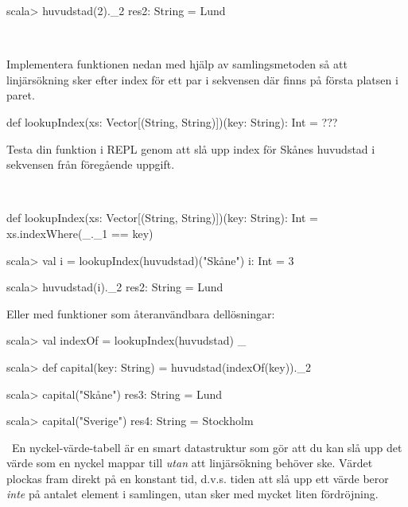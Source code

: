 \SubtaskSolved
\begin{REPL}
scala> huvudstad(2)._2
res2: String = Lund
\end{REPL}

\QUESTEND




\QUESTBEGIN

\Task \what~

\Subtask Implementera funktionen  nedan med hjälp av samlingsmetoden  så att linjärsökning sker efter index för ett par i sekvensen där  finns på första platsen i paret.

\begin{Code}
def lookupIndex(xs: Vector[(String, String)])(key: String): Int = ???
\end{Code}

\Subtask Testa din funktion i REPL genom att slå upp index för Skånes huvudstad i sekvensen  från föregående uppgift.

\SOLUTION

\TaskSolved \what~

\SubtaskSolved
\begin{Code}
def lookupIndex(xs: Vector[(String, String)])(key: String): Int =
  xs.indexWhere(_._1 == key)
\end{Code}

\SubtaskSolved
\begin{REPL}
scala> val i = lookupIndex(huvudstad)("Skåne")
i: Int = 3

scala> huvudstad(i)._2
res2: String = Lund
\end{REPL}

\noindent Eller med funktioner som återanvändbara dellösningar:
\begin{REPL}
scala> val indexOf = lookupIndex(huvudstad) _

scala> def capital(key: String) = huvudstad(indexOf(key))._2

scala> capital("Skåne")
res3: String = Lund

scala> capital("Sverige")
res4: String = Stockholm
\end{REPL}

\QUESTEND




\QUESTBEGIN

\Task \what~En nyckel-värde-tabell är en smart datastruktur som gör att du kan slå upp det värde som en nyckel mappar till \emph{utan} att linjärsökning behöver ske. Värdet plockas fram direkt på en konstant tid, d.v.s. tiden att slå upp ett värde beror \emph{inte} på antalet element i samlingen, utan sker med mycket liten fördröjning.

